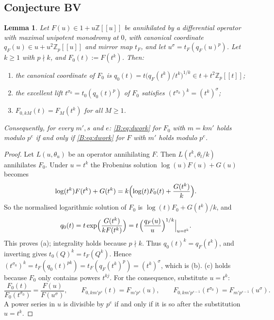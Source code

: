 \documentclass[11pt,a4paper]{article}
\newtheorem{lemma}[theorem]{Lemma}
\theoremstyle{definition}\newtheorem{definition}[theorem]{Definition}
\theoremstyle{remark}\newtheorem{remark}[theorem]{Remark}
\newcommand{\Z}{\mathbb Z}
\numberwithin{equation}{section}
\begin{document}
\subsection{Conjecture BV}
\begin{lemma}\label{B:lem:subst}
Let $F(u)\in1+u\Z[[u]]$ be annihilated by a differential operator with maximal unipotent
monodromy at $0$, with canonical coordinate $q_F(u)\in u+u^2\Z_p[[u]]$ and mirror map $t_F$, and
let $u^{\sigma}=t_F(q_F(u)^p)$. Let $k\ge1$ with $p\nmid k$, and $F_0(t):=F(t^k)$. Then:
\begin{enumerate}[label=\textup{(\alph*)}]
\item the canonical coordinate of $F_0$ is $q_0(t)=t\bigl(q_F(t^k)/t^k\bigr)^{1/k}\in t+t^2\Z_p[[t]]$;
\item the excellent lift $t^{\sigma_0}=t_0(q_0(t)^p)$ of $F_0$ satisfies $(t^{\sigma_0})^k=(t^k)^\sigma$;
\item $F_{0,kM}(t)=F_M(t^k)$ for all $M\ge1$.
\end{enumerate}
Consequently, for every $m',s$ and $e$: \eqref{B:eq:dwork} for $F_0$ with $m=km'$ holds modulo
$p^e$ if and only if \eqref{B:eq:dwork} for $F$ with $m'$ holds modulo $p^e$.
\end{lemma}
\begin{proof}
Let $L(u,\theta_u)$ be an operator annihilating $F$. Then $L(t^k,\theta_t/k)$ annihilates $F_0$.
Under $u=t^k$ the Frobenius solution $\log(u)F(u)+G(u)$ becomes
\[
\log(t^k)F(t^k)+G(t^k)=k\Bigl(\log(t)F_0(t)+\frac{G(t^k)}k\Bigr).
\]
So the normalised logarithmic solution of $F_0$ is $\log(t)F_0+G(t^k)/k$, and
\[
q_0(t)=t\exp\Bigl(\frac{G(t^k)}{kF(t^k)}\Bigr)=t\,\Bigl(\frac{q_F(u)}{u}\Bigr)^{1/k}\Big|_{u=t^k}.
\]
This proves (a); integrality holds because $p\nmid k$. Thus $q_0(t)^k=q_F(t^k)$, and inverting gives $t_0(Q)^k=t_F(Q^k)$. Hence
$(t^{\sigma_0})^k=t_F(q_0(t)^{pk})=t_F(q_F(t^k)^p)=(t^k)^\sigma$, which is (b). (c) holds because $F_0$
only contains powers $t^{kj}$. For the consequence, substitute $u=t^k$:
\[
\frac{F_0(t)}{F_0(t^{\sigma_0})}=\frac{F(u)}{F(u^\sigma)},\qquad F_{0,km'p^s}(t)=F_{m'p^s}(u),\qquad
F_{0,km'p^{s-1}}(t^{\sigma_0})=F_{m'p^{s-1}}(u^\sigma).
\] A power series in $u$ is divisible by
$p^e$ if and only if it is so after the substitution $u=t^k$.
\end{proof}
\end{document}

